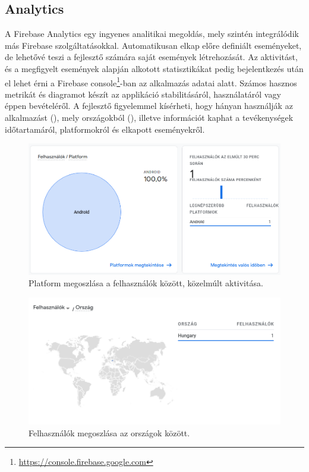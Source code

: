 \subsection{Analytics}
A Firebase Analytics egy ingyenes analitikai megoldás, mely szintén integrálódik más Firebase szolgáltatásokkal. Automatikusan elkap előre definiált eseményeket, de lehetővé teszi a fejlesztő számára saját események létrehozását. Az aktivitást, és a megfigyelt események alapján alkotott statisztikákat pedig bejelentkezés után el lehet érni a Firebase console\footnote{\url{https://console.firebase.google.com}}-ban az alkalmazás adatai alatt. \cite{Analytics} Számos hasznos metrikát és diagramot készít az applikáció stabilitásáról, használatáról vagy éppen bevételéről. A fejlesztő figyelemmel kísérheti, hogy hányan használják az alkalmazást (), mely országokból (), illetve információt kaphat a tevékenységek időtartamáról, platformokról és elkapott eseményekről.

\begin{figure}[!ht]
	\centering
	\includegraphics[width=150mm, keepaspectratio]{figures/analytics_platform.png}
	\caption{Platform megoszlása a felhasználók között, közelmúlt aktivitása.}
	\label{fig:AnalyticsPlatform}
\end{figure}

\begin{figure}[!ht]
	\centering
	\includegraphics[width=150mm, keepaspectratio]{figures/analytics_countries.png}
	\caption{Felhasználók megoszlása az országok között.}
	\label{fig:AnalyticsCountries}
\end{figure}

